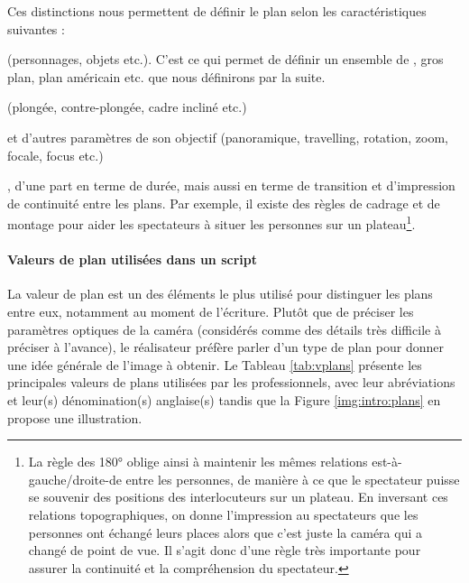 Ces distinctions nous permettent de définir le plan selon les caractéristiques suivantes : 
\begin{liste}
	\item {} (personnages, objets etc.).
	C'est ce qui permet de définir un ensemble de , gros plan, plan américain etc. que nous définirons par la suite.
	
	\item {} (plongée, contre-plongée, cadre incliné etc.)

	\item {} et d'autres paramètres de son objectif (panoramique, travelling, rotation, zoom, focale, focus etc.)

	\item {}, d'une part en terme de durée, mais aussi en terme de transition et d'impression de continuité entre les plans. 
	Par exemple, il existe des règles de cadrage et de montage pour aider les spectateurs à situer les personnes sur un plateau\footnote{La règle des 180° oblige ainsi à maintenir les mêmes relations est-à-gauche/droite-de entre les personnes, de manière à ce que le spectateur puisse se souvenir des positions des interlocuteurs sur un plateau. En inversant ces relations topographiques, on donne l'impression au spectateurs que les personnes ont échangé leurs places alors que c'est juste la caméra qui a changé de point de vue. Il s'agit donc d'une règle très importante pour assurer la continuité et la compréhension du spectateur.}.
\end{liste}


\paragraph{Valeurs de plan utilisées dans un script}
La valeur de plan est un des éléments le plus utilisé pour distinguer les plans entre eux, notamment au moment de l'écriture. 
Plutôt que de préciser les paramètres optiques de la caméra (considérés comme des détails très difficile à préciser à l'avance), le réalisateur préfère parler d'un type de plan pour donner une idée générale de l'image à obtenir. 
Le Tableau \ref{tab:vplans} présente les principales valeurs de plans utilisées par les professionnels, avec leur abréviations et leur(s) dénomination(s) anglaise(s) tandis que la Figure \ref{img:intro:plans} en propose une illustration.

